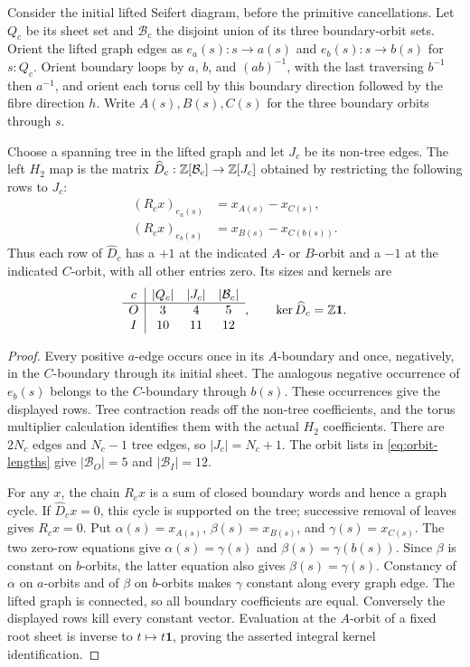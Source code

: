\begin{lemma}\label{lem:boundary-incidence}
Consider the initial lifted Seifert diagram, before the primitive cancellations. Let $Q_c$ be its sheet set and $\mathcal B_c$ the disjoint union of its three boundary-orbit sets. Orient the lifted graph edges as $e_a(s):s\to a(s)$ and $e_b(s):s\to b(s)$ for $s:Q_c$. Orient boundary loops by $a$, $b$, and $(ab)^{-1}$, with the last traversing $b^{-1}$ then $a^{-1}$, and orient each torus cell by this boundary direction followed by the fibre direction $h$. Write $A(s),B(s),C(s)$ for the three boundary orbits through $s$.

Choose a spanning tree in the lifted graph and let $J_c$ be its non-tree edges. The left $H_2$ map is the matrix $\widehat D_c:\mathbb Z[\mathcal B_c]\to\mathbb Z[J_c]$ obtained by restricting the following rows to $J_c$:
\[
\begin{aligned}
(R_cx)_{e_a(s)}&=x_{A(s)}-x_{C(s)},\\
(R_cx)_{e_b(s)}&=x_{B(s)}-x_{C(b(s))}.
\end{aligned}
\]
Thus each row of $\widehat D_c$ has a $+1$ at the indicated $A$- or $B$-orbit and a $-1$ at the indicated $C$-orbit, with all other entries zero. Its sizes and kernels are
\[
\begin{array}{c|ccc}
c&|Q_c|&|J_c|&|\mathcal B_c|\\\hline
O&3&4&5\\
I&10&11&12
\end{array},
\qquad
\ker\widehat D_c=\mathbb Z\mathbf1.
\]
\end{lemma}
\begin{proof}
Every positive $a$-edge occurs once in its $A$-boundary and once, negatively, in the $C$-boundary through its initial sheet. The analogous negative occurrence of $e_b(s)$ belongs to the $C$-boundary through $b(s)$. These occurrences give the displayed rows. Tree contraction reads off the non-tree coefficients, and the torus multiplier calculation identifies them with the actual $H_2$ coefficients. There are $2N_c$ edges and $N_c-1$ tree edges, so $|J_c|=N_c+1$. The orbit lists in \eqref{eq:orbit-lengths} give $|\mathcal B_O|=5$ and $|\mathcal B_I|=12$.

For any $x$, the chain $R_cx$ is a sum of closed boundary words and hence a graph cycle. If $\widehat D_cx=0$, this cycle is supported on the tree; successive removal of leaves gives $R_cx=0$. Put $\alpha(s)=x_{A(s)}$, $\beta(s)=x_{B(s)}$, and $\gamma(s)=x_{C(s)}$. The two zero-row equations give $\alpha(s)=\gamma(s)$ and $\beta(s)=\gamma(b(s))$. Since $\beta$ is constant on $b$-orbits, the latter equation also gives $\beta(s)=\gamma(s)$. Constancy of $\alpha$ on $a$-orbits and of $\beta$ on $b$-orbits makes $\gamma$ constant along every graph edge. The lifted graph is connected, so all boundary coefficients are equal. Conversely the displayed rows kill every constant vector. Evaluation at the $A$-orbit of a fixed root sheet is inverse to $t\mapsto t\mathbf1$, proving the asserted integral kernel identification.
\end{proof}

